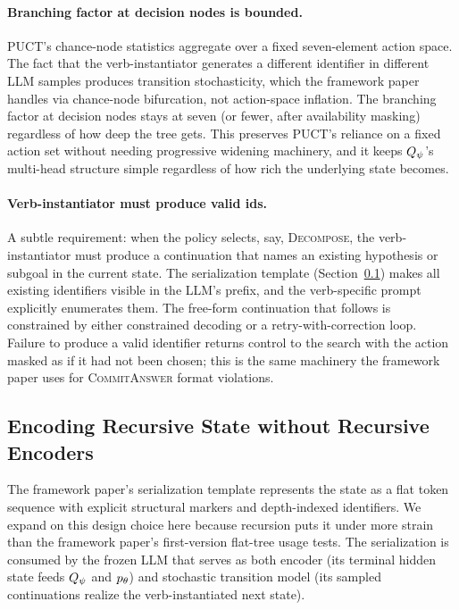 \paragraph{Branching factor at decision nodes is bounded.}
PUCT's chance-node statistics aggregate over a fixed seven-element
action space. The fact that the verb-instantiator generates a different
identifier in different LLM samples produces transition stochasticity,
which the framework paper handles via chance-node bifurcation, not
action-space inflation. The branching factor at decision nodes stays at
seven (or fewer, after availability masking) regardless of how deep the
tree gets. This preserves PUCT's reliance on a fixed action set without
needing progressive widening machinery, and it keeps $Q_{\psi}$'s
multi-head structure simple regardless of how rich the underlying state
becomes.

\paragraph{Verb-instantiator must produce valid ids.}
A subtle requirement: when the policy selects, say,
\textsc{Decompose}, the verb-instantiator must produce a continuation
that names an existing hypothesis or subgoal in the current state. The
serialization template (Section~\ref{sec:method-serialization}) makes
all existing identifiers visible in the LLM's prefix, and the
verb-specific prompt explicitly enumerates them. The free-form
continuation that follows is constrained by either constrained decoding
\citep{willard2023outlines} or a retry-with-correction loop. Failure
to produce a valid identifier returns control to the search with the
action masked as if it had not been chosen; this is the same machinery
the framework paper uses for \textsc{CommitAnswer} format violations.

\subsection{Encoding Recursive State without Recursive Encoders}
\label{sec:method-serialization}

The framework paper's serialization template represents the state as a
flat token sequence with explicit structural markers and depth-indexed
identifiers. We expand on this design choice here because recursion
puts it under more strain than the framework paper's first-version
flat-tree usage tests. The serialization is consumed by the frozen LLM
that serves as both encoder (its terminal hidden state feeds $Q_{\psi}$
and $p_{\theta}$) and stochastic transition model (its sampled
continuations realize the verb-instantiated next state).

